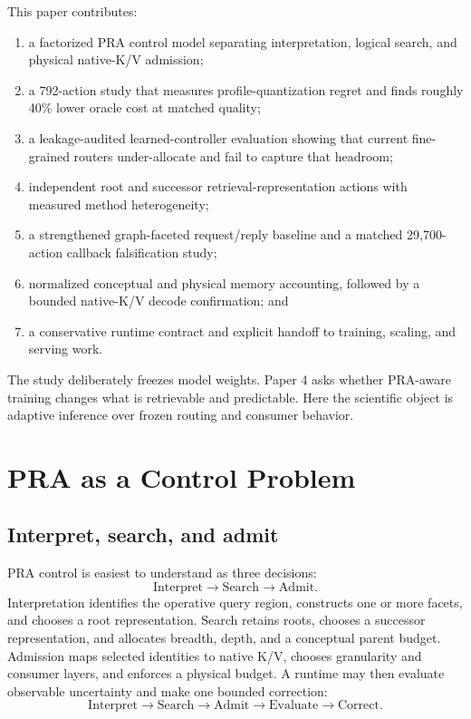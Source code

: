 \documentclass[11pt]{article}
\begin{document}
This paper contributes:
\begin{enumerate}
\item a factorized PRA control model separating interpretation, logical search, and physical
native-K/V admission;
\item a 792-action study that measures profile-quantization regret and finds roughly 40\% lower
oracle cost at matched quality;
\item a leakage-audited learned-controller evaluation showing that current fine-grained routers
under-allocate and fail to capture that headroom;
\item independent root and successor retrieval-representation actions with measured method
heterogeneity;
\item a strengthened graph-faceted request/reply baseline and a matched 29,700-action callback
falsification study;
\item normalized conceptual and physical memory accounting, followed by a bounded native-K/V
decode confirmation; and
\item a conservative runtime contract and explicit handoff to training, scaling, and serving work.
\end{enumerate}

The study deliberately freezes model weights. Paper 4 asks whether PRA-aware training changes what
is retrievable and predictable. Here the scientific object is adaptive inference over frozen
routing and consumer behavior.

\section{PRA as a Control Problem}

\subsection{Interpret, search, and admit}

PRA control is easiest to understand as three decisions:
\[
\boxed{\text{Interpret}}\rightarrow
\boxed{\text{Search}}\rightarrow
\boxed{\text{Admit}}.
\]
Interpretation identifies the operative query region, constructs one or more facets, and chooses a
root representation. Search retains roots, chooses a successor representation, and allocates
breadth, depth, and a conceptual parent budget. Admission maps selected identities to native K/V,
chooses granularity and consumer layers, and enforces a physical budget. A runtime may then evaluate
observable uncertainty and make one bounded correction:
\[
\text{Interpret}\rightarrow\text{Search}\rightarrow\text{Admit}
\rightarrow\text{Evaluate}\rightarrow\text{Correct}.
\]
\end{document}
